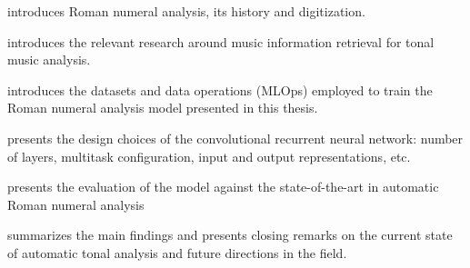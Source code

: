 introduces Roman numeral analysis, its history and
digitization.

 introduces the relevant research around
music information retrieval for tonal music analysis.

 introduces the
datasets and data operations (MLOps) employed to train the
Roman numeral analysis model presented in this thesis.

 presents the design choices of the
convolutional recurrent neural network: number of layers,
multitask configuration, input and output representations,
etc.

 presents the evaluation of
the model against the state-of-the-art in automatic Roman
numeral analysis

 summarizes the main findings and
presents closing remarks on the current state of automatic
tonal analysis and future directions in the field.
